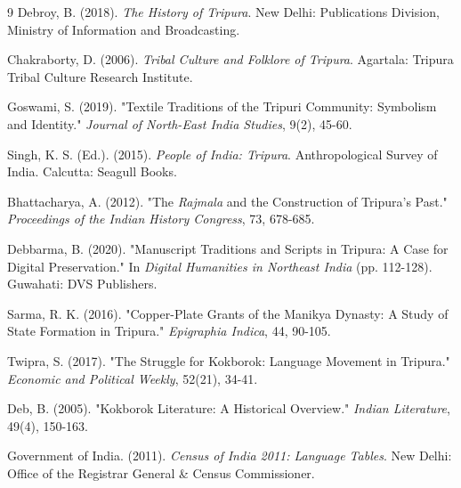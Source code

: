 \documentclass{article}
\begin{document}
\begin{thebibliography}{9}
    Debroy, B. (2018). \textit{The History of Tripura}. New Delhi: Publications Division, Ministry of Information and Broadcasting.

    Chakraborty, D. (2006). \textit{Tribal Culture and Folklore of Tripura}. Agartala: Tripura Tribal Culture Research Institute.

    Goswami, S. (2019). "Textile Traditions of the Tripuri Community: Symbolism and Identity." \textit{Journal of North-East India Studies}, 9(2), 45-60.

    Singh, K. S. (Ed.). (2015). \textit{People of India: Tripura}. Anthropological Survey of India. Calcutta: Seagull Books.

    Bhattacharya, A. (2012). "The \textit{Rajmala} and the Construction of Tripura's Past." \textit{Proceedings of the Indian History Congress}, 73, 678-685.

    Debbarma, B. (2020). "Manuscript Traditions and Scripts in Tripura: A Case for Digital Preservation." In \textit{Digital Humanities in Northeast India} (pp. 112-128). Guwahati: DVS Publishers.

    Sarma, R. K. (2016). "Copper-Plate Grants of the Manikya Dynasty: A Study of State Formation in Tripura." \textit{Epigraphia Indica}, 44, 90-105.

    Twipra, S. (2017). "The Struggle for Kokborok: Language Movement in Tripura." \textit{Economic and Political Weekly}, 52(21), 34-41.

    Deb, B. (2005). "Kokborok Literature: A Historical Overview." \textit{Indian Literature}, 49(4), 150-163.

    Government of India. (2011). \textit{Census of India 2011: Language Tables}. New Delhi: Office of the Registrar General \& Census Commissioner.

\end{thebibliography}
\end{document}
